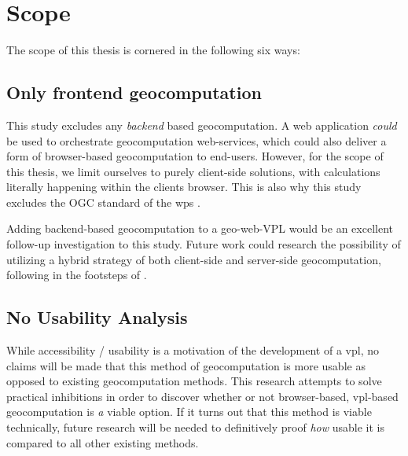 


\newpage
\section{Scope}
The scope of this thesis is cornered in the following six ways: 

\subsection*{Only frontend geocomputation}
This study excludes any \emph {backend} based geocomputation.
A web application \textit{could} be used to orchestrate geocomputation web-services, which could also deliver a form of browser-based geocomputation to end-users. 
However, for the scope of this thesis, we limit ourselves to purely client-side solutions, with calculations literally happening within the clients browser. 
This is also why this study excludes the OGC standard of the \ac{wps} \cite{ogc_web_2015}.

Adding backend-based geocomputation to a geo-web-VPL would be an excellent follow-up investigation to this study. 
Future work could research the possibility of utilizing a hybrid strategy of both client-side and server-side geocomputation, following in the footsteps of \cite{panidi_hybrid_2015}. 

\subsection*{No Usability Analysis} %
While accessibility / usability is a motivation of the development of a \ac{vpl}, no claims will be made that this method of geocomputation is more usable as opposed to existing geocomputation methods. This research attempts to solve practical inhibitions in order to discover whether or not browser-based, vpl-based geocomputation is \emph{a} viable option. If it turns out that this method is viable technically, future research will be needed to definitively proof \emph{how} usable it is compared to all other existing methods.  


